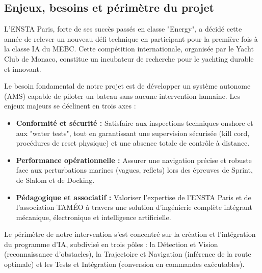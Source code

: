 \documentclass[11pt, a4paper]{article}
\begin{document}
\subsection{Enjeux, besoins et périmètre du projet}
L'ENSTA Paris, forte de ses succès passés en classe "Energy", a décidé cette année de relever un nouveau défi technique en participant pour la première fois à la classe IA du MEBC. Cette compétition internationale, organisée par le Yacht Club de Monaco, constitue un incubateur de recherche pour le yachting durable et innovant.

Le besoin fondamental de notre projet est de développer un système autonome (AMS) capable de piloter un bateau sans aucune intervention humaine. Les enjeux majeurs se déclinent en trois axes :
\begin{itemize}
    \item \textbf{Conformité et sécurité :} Satisfaire aux inspections techniques onshore et aux "water tests", tout en garantissant une supervision sécurisée (kill cord, procédures de reset physique) et une absence totale de contrôle à distance.
    \item \textbf{Performance opérationnelle :} Assurer une navigation précise et robuste face aux perturbations marines (vagues, reflets) lors des épreuves de Sprint, de Slalom et de Docking.
    \item \textbf{Pédagogique et associatif :} Valoriser l'expertise de l'ENSTA Paris et de l'association TAMÉO à travers une solution d'ingénierie complète intégrant mécanique, électronique et intelligence artificielle.
\end{itemize}

Le périmètre de notre intervention s'est concentré sur la création et l'intégration du programme d'IA, subdivisé en trois pôles : la Détection et Vision (reconnaissance d'obstacles), la Trajectoire et Navigation (inférence de la route optimale) et les Tests et Intégration (conversion en commandes exécutables).
\end{document}
